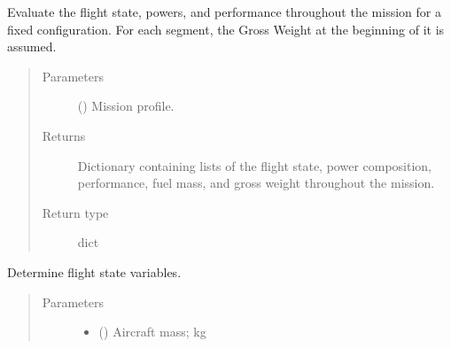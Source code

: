 \documentclass[letterpaper,10pt,english]{sphinxmanual}
\begin{document}
\begin{fulllineitems}

\begin{fulllineitems}
\label{\detokenize{modules/helicopter:helicopter.Helicopter.evaluate}}
\sphinxAtStartPar
Evaluate the flight state, powers, and performance throughout the
mission for a fixed configuration. For each segment, the Gross Weight
at the beginning of it is assumed.
\begin{quote}\begin{description}
\item[{Parameters}] \leavevmode
\sphinxAtStartPar
{} ({\hyperref[\detokenize{modules/mission:mission.Mission}]{}}) \textendash{} Mission profile.

\item[{Returns}] \leavevmode
\sphinxAtStartPar
Dictionary containing lists of the flight state, power composition,
performance, fuel mass, and gross weight throughout the mission.

\item[{Return type}] \leavevmode
\sphinxAtStartPar
dict

\end{description}\end{quote}

\end{fulllineitems}


\begin{fulllineitems}
\label{\detokenize{modules/helicopter:helicopter.Helicopter.flight_state}}
\sphinxAtStartPar
Determine flight state variables.
\begin{quote}\begin{description}
\item[{Parameters}] \leavevmode\begin{itemize}
\item {} 
\sphinxAtStartPar
{} () \textendash{} Aircraft mass; kg


\end{itemize}
\end{description}
\end{quote}
\end{fulllineitems}
\end{fulllineitems}
\end{document}
